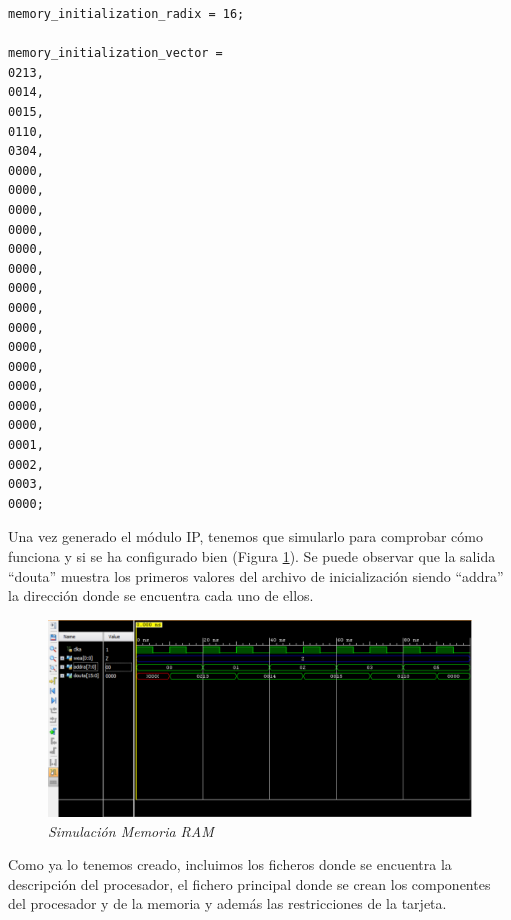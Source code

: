 \begin{lstlisting}    
memory_initialization_radix = 16;

memory_initialization_vector =
0213,
0014,
0015,
0110,
0304,
0000,
0000,
0000,
0000,
0000,
0000,
0000,
0000,
0000,
0000,
0000,
0000,
0000,
0000,
0001,
0002,
0003,
0000;
\end{lstlisting}

Una vez generado el módulo IP, tenemos que simularlo para comprobar cómo funciona y si se ha configurado bien (Figura \ref{memoria}). 
Se puede observar que la salida ``douta'' muestra los primeros valores del archivo de inicialización siendo ``addra'' la dirección 
donde se encuentra cada uno de ellos.

\begin{figure}[H]
    \centering
    \includegraphics[width = 1\textwidth]{imagenes/memoria.png}
    \caption{\textit{Simulación Memoria RAM}}\label{memoria}
\end{figure}

Como ya lo tenemos creado, incluimos los ficheros donde se encuentra la descripción del procesador, el fichero principal donde 
se crean los componentes del procesador y de la memoria y además las restricciones de la tarjeta.

